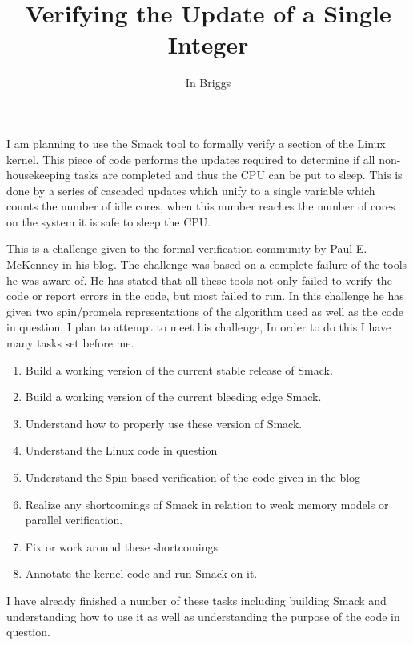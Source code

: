 \documentclass{article}
\begin{document}
\title{Verifying the Update of a Single Integer}
\author{In Briggs}
\maketitle
I am planning to use the Smack tool to formally verify a section of the Linux kernel. This piece of code performs the updates required to determine if all non-housekeeping tasks are completed and thus the CPU can be put to sleep. This is done by a series of cascaded updates which unify to a single variable which counts the number of idle cores, when this number reaches the number of cores on the system it is safe to sleep the CPU.

This is a challenge given to the formal verification community by Paul E. McKenney in his blog\cite{blog.wp}. The challenge was based on a complete failure of the tools he was aware of. He has stated that all these tools not only failed to verify the code or report errors in the code, but most failed to run. In this challenge he has given two spin/promela representations of the algorithm used as well as the code in question. I plan to attempt to meet his challenge, In order to do this I have many tasks set before me.

\begin{enumerate}
	\item Build a working version of the current stable release of Smack.
	\item Build a working version of the current bleeding edge Smack.
	\item Understand how to properly use these version of Smack.
	\item Understand the Linux code in question
	\item Understand the Spin based verification of the code given in the blog
	\item Realize any shortcomings of Smack in relation to weak memory models or parallel verification.
	\item Fix or work around these shortcomings
	\item Annotate the kernel code and run Smack on it.
\end{enumerate}

I have already finished a number of these tasks including building Smack and understanding how to use it as well as understanding the purpose of the code in question.


{
  
  
}
\end{document}
